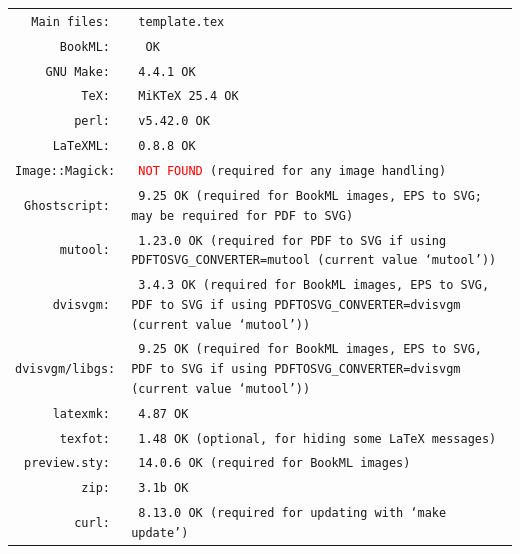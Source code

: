\documentclass[a4paper,british]{article}
\begin{document}
\begin{tabularx}{\textwidth}[t]{>{\color{MidnightBlue}\tt}r@{\texttt{\ }}>{\tt}X}
  Main files:    & \textcolor{OliveGreen}{template.tex}                                          \\
  BookML:        & \textcolor{OliveGreen}{\BookMLversion{} OK}                                   \\
  GNU Make:      & \textcolor{OliveGreen}{4.4.1 OK}                                              \\
  TeX:           & \textcolor{OliveGreen}{MiKTeX 25.4 OK}                                        \\
  perl:          & \textcolor{OliveGreen}{v5.42.0 OK}                                            \\
  LaTeXML:       & \textcolor{OliveGreen}{0.8.8 OK}                                              \\
  Image::Magick: & \textcolor{red}{NOT FOUND} (required for any image handling)                  \\
  Ghostscript:   & \textcolor{OliveGreen}{9.25 OK} (required for BookML images, EPS to SVG; may be required for PDF to SVG) \\
  mutool:        & \textcolor{OliveGreen}{1.23.0 OK} (required for PDF to SVG if using PDFTOSVG\_CONVERTER=mutool (current value `mutool')) \\
  dvisvgm:       & \textcolor{OliveGreen}{3.4.3 OK} (required for BookML images, EPS to SVG, PDF to SVG if using PDFTOSVG\_CONVERTER=dvisvgm (current value `mutool')) \\
  dvisvgm/libgs: & \textcolor{OliveGreen}{9.25 OK} (required for BookML images, EPS to SVG, PDF to SVG if using PDFTOSVG\_CONVERTER=dvisvgm (current value `mutool'))  \\
  latexmk:       & \textcolor{OliveGreen}{4.87 OK}                                               \\
  texfot:        & \textcolor{OliveGreen}{1.48 OK} (optional, for hiding some LaTeX messages)    \\
  preview.sty:   & \textcolor{OliveGreen}{14.0.6 OK} (required for BookML images)                \\
  zip:           & \textcolor{OliveGreen}{3.1b OK}                                               \\
  curl:          & \textcolor{OliveGreen}{8.13.0 OK} (required for updating with `make update')
\end{tabularx}
\end{document}
